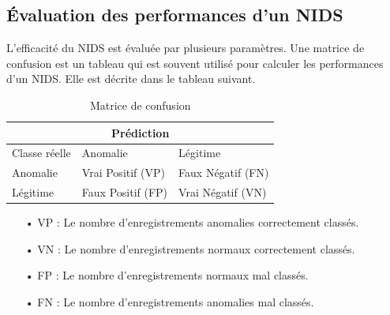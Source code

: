 \subsection{Évaluation des performances d'un NIDS}
\label{evaluation}
L'efficacité du NIDS est évaluée par plusieurs paramètres. Une matrice de confusion est un tableau qui est souvent utilisé pour calculer les performances d'un NIDS. Elle est décrite dans le tableau suivant.
\begin{table}[h]
	\begin{center}
		\begin{tabular}{  | m{4cm} | m{4cm} | m{4cm} | }
			\multicolumn{3}{c}{Prédiction}\\
			\hline
			Classe réelle  & Anomalie & Légitime\\
			\hline
			Anomalie & Vrai Positif (VP) & Faux Négatif (FN)\\
			\hline
			Légitime & Faux Positif (FP) & Vrai Négatif (VN)\\
			\hline
		\end{tabular}
		\caption{Matrice de confusion}
	\end{center}
	\label{table:NIDS_Evaluation}
\end{table}

\begin{itemize}
	\item[• VP]: Le nombre d’enregistrements anomalies correctement classés.\\
	\item[• VN]: Le nombre d’enregistrements normaux correctement classés.\\
	\item[• FP]: Le nombre d’enregistrements normaux mal classés.\\
	\item[• FN]: Le nombre d’enregistrements anomalies mal classés.\\ 
\end{itemize}

